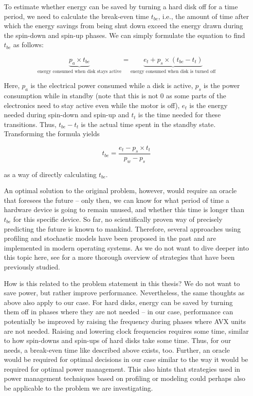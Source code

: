 {To estimate whether energy can be saved by turning a hard disk off for a time period, we need to calculate the break-even time $t_{be}$, i.e., the amount of time after which the energy savings from being shut down exceed the energy drawn during the spin-down and spin-up phases. We can simply formulate the equation to find $t_{be}$ as follows:

\begin{displaymath}
\underbrace{p_a \times t_{be}}_{\text{energy consumed when disk stays active}} = \underbrace{e_t + p_s \times (t_{be} - t_t)}_{\text{energy consumed when disk is turned off}}
\end{displaymath}

Here, $p_a$ is the electrical power consumed while a disk is active, $p_s$ is the power consumption while in standby (note that this is not $0$ as some parts of the electronics need to stay active even while the motor is off), $e_t$ is the energy needed during spin-down and spin-up and $t_t$ is the time needed for these transitions. Thus, $t_{be} - t_t$ is the actual time spent in the standby state. Transforming the formula yields

\begin{displaymath}
t_{be} = \frac{e_t - p_s \times t_t}{p_w - p_s}
\end{displaymath}

\noindent as a way of directly calculating $t_{be}$.

An optimal solution to the original problem, however, would require an oracle that foresees the future -- only then, we can know for what period of time a hardware device is going to remain unused, and whether this time is longer than $t_{be}$ for this specific device. So far, no scientifically proven way of precisely predicting the future is known to mankind. Therefore, several approaches using profiling and stochastic models have been proposed in the past and are implemented in modern operating systems. As we do not want to dive deeper into this topic here, see \citeauthor{lu2001comparing} \cite{lu2001comparing} for a more thorough overview of strategies that have been previously studied.

How is this related to the problem statement in this thesis? We do not want to save power, but rather improve performance. Nevertheless, the same thoughts as above also apply to our case. For hard disks, energy can be saved by turning them off in phases where they are not needed -- in our case, performance can potentially be improved by raising the frequency during phases where \gls{AVX} units are not needed. Raising and lowering clock frequencies requires some time, similar to how spin-downs and spin-ups of hard disks take some time. Thus, for our needs, a break-even time like described above exists, too. Further, an oracle would be required for optimal decisions in our case similar to the way it would be required for optimal power management. This also hints that strategies used in power management techniques based on profiling or modeling could perhaps also be applicable to the problem we are investigating.

}
